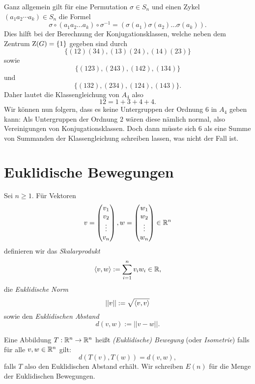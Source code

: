 \documentclass{book}
\begin{document}
\begin{exa}
    Ganz allgemein gilt für eine Permutation $\sigma \in S_n$ und einen Zykel $(a_1 a_2 \cdots a_k) \in S_n$ die Formel
    \[
        \sigma \circ (a_1 a_2 ... a_k) \circ \sigma^{-1} = (\sigma(a_1) \sigma(a_2) ... \sigma(a_k)).
    \]
    Dies hilft bei der Berechnung der Konjugationsklassen, welche neben dem Zentrum $\operatorname{Z}(G) = \{1\}$ gegeben sind durch
    \[
        \{(12)(34),(13)(24),(14)(23)\}
    \]
    sowie 
    \[
        \{(123),(243),(142),(134)\}
    \]
    und
    \[
        \{(132),(234),(124),(143)\}.
    \]
    Daher lautet die Klassengleichung von $A_4$ also
    \[
        12 = 1 + 3 + 4 + 4.
    \]
    Wir können nun folgern, dass es keine Untergruppen der Ordnung $6$ in $A_4$
    geben kann: Als Untergruppen der Ordnung $2$ wären diese nämlich normal,
    also Vereinigungen von Konjugationsklassen. Doch dann müsste sich $6$ als
    eine Summe von Summanden der Klassengleichung schreiben lassen, was nicht
    der Fall ist. 
\end{exa}

\section{Euklidische Bewegungen}%
\label{sec:euklidische_bewegungen}

Sei $n \ge 1$. Für Vektoren
\[
    v = \begin{pmatrix}  v_1\\ v_2 \\ \vdots \\ v_n \end{pmatrix},
    w = \begin{pmatrix}  w_1\\ w_2 \\ \vdots \\ w_n \end{pmatrix} \in \mathbb{R}^n
\]
definieren wir das \emph{Skalarprodukt}
\[
    \langle  v,w  \rangle := \sum_{i=1}^n v_i w_i \in \mathbb{R},
\]
die \emph{Euklidische Norm} 
\[
    ||v|| := \sqrt{\langle v,v \rangle}
\]
sowie den \emph{Euklidischen Abstand}
\[
    d(v,w) := || v-w ||.
\]

\begin{defi}
    \label{defi:bewegung}
    Eine Abbildung $T: \mathbb{R}^n \to \mathbb{R}^n$ heißt \emph{(Euklidische) Bewegung} (oder \emph{Isometrie}) falls für alle $v,w \in \mathbb{R}^n$ gilt:
    \[
        d(T(v),T(w)) = d(v,w),
    \]
    falls $T$ also den Euklidischen Abstand erhält. Wir schreiben $E(n)$ für die Menge der Euklidischen Bewegungen. 
\end{defi}
\end{document}
